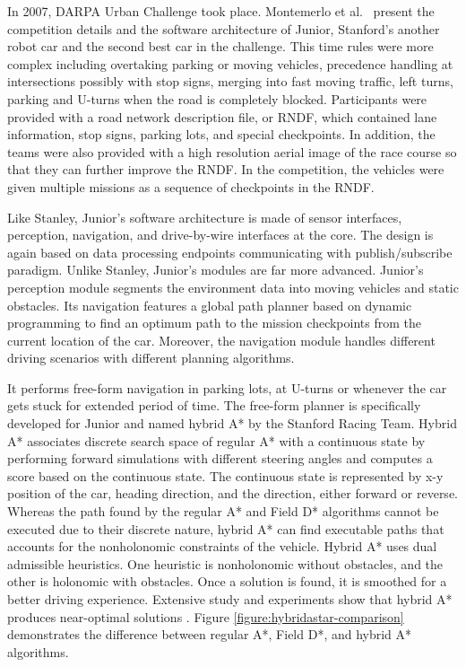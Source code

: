 In 2007, DARPA Urban Challenge took place. Montemerlo et al.\
\cite{Montemerlo2009JuniorTS} present the competition details and the software
architecture of Junior, Stanford's another robot car and the second best car in
the challenge. This time rules were more complex including overtaking parking
or moving vehicles, precedence handling at intersections possibly with stop
signs, merging into fast moving traffic, left turns, parking and U-turns when
the road is completely blocked. Participants were provided with a road network
description file, or RNDF, which contained lane information, stop signs,
parking lots, and special checkpoints. In addition, the teams were also
provided with a high resolution aerial image of the race course so that they
can further improve the RNDF. In the competition, the vehicles were given
multiple missions as a sequence of checkpoints in the RNDF.

Like Stanley, Junior's software architecture is made of sensor interfaces,
perception, navigation, and drive-by-wire interfaces at the core. The design
is again based on data processing endpoints communicating with
publish/subscribe paradigm. Unlike Stanley, Junior's modules are far more
advanced. Junior's perception module segments the environment data into moving
vehicles and static obstacles. Its navigation features a global path planner
based on dynamic programming to find an optimum path to the mission checkpoints
from the current location of the car. Moreover, the navigation module handles
different driving scenarios with different planning algorithms.

It performs free-form navigation in parking lots, at U-turns or whenever the
car gets stuck for extended period of time. The free-form planner is
specifically developed for Junior and named hybrid A* by the Stanford Racing
Team. Hybrid A* associates discrete search space of regular A* with a
continuous state by performing forward simulations with different steering
angles and computes a score based on the continuous state. The continuous state
is represented by x-y position of the car, heading direction, and the
direction, either forward or reverse. Whereas the path found by the regular A*
and Field D* algorithms cannot be executed due to their discrete nature, hybrid
A* can find executable paths that accounts for the nonholonomic constraints of
the vehicle. Hybrid A* uses dual admissible heuristics. One heuristic is
nonholonomic without obstacles, and the other is holonomic with obstacles. Once
a solution is found, it is smoothed for a better driving experience. Extensive
study and experiments show that hybrid A* produces near-optimal solutions
\cite{Dolgov2010PathPF, Petereit2012Application}. Figure
\ref{figure:hybridastar-comparison} demonstrates the difference between regular
A*, Field D*, and hybrid A* algorithms.

